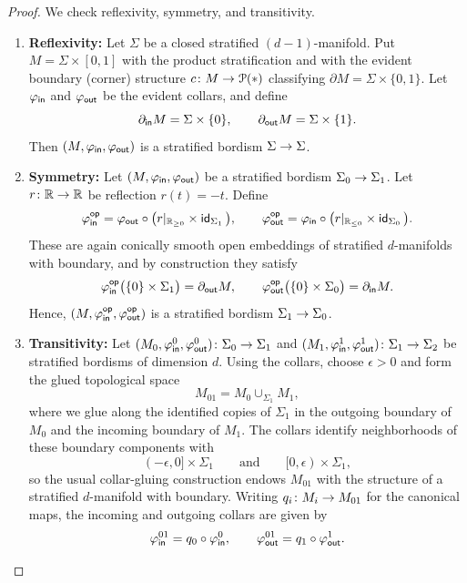 \begin{proof}
    We check reflexivity, symmetry, and transitivity.
    \begin{enumerate}
        \item \textbf{Reflexivity:} Let $\Sigma$ be a closed stratified $(d-1)$-manifold. Put $M = \Sigma\times[0,1]$ with the product stratification and with the evident boundary (corner) structure $c\colon M\rightarrow \mathcal P(*)$ classifying $\partial M = \Sigma\times\{0,1\}$. Let $\varphi_{\sf in}$ and $\varphi_{\sf out}$ be the evident collars, and define
        \begin{equation}
            \partial_{\sf in}M = \Sigma\times\{0\}, \qquad \partial_{\sf out}M = \Sigma\times\{1\}.
        \end{equation}
        Then $(M,\varphi_{\sf in},\varphi_{\sf out})$ is a stratified bordism $\Sigma\rightarrow \Sigma$.

        \item \textbf{Symmetry:} Let $(M,\varphi_{\sf in},\varphi_{\sf out})$ be a stratified bordism $\Sigma_0\rightarrow \Sigma_1$. Let $r\colon \mathbb R\rightarrow \mathbb R$ be reflection $r(t)=-t$. Define
        \[
            \varphi^{\mathsf{op}}_{\sf in}= \varphi_{\sf out}\circ\big(r|_{\mathbb R_{\ge 0}}\times \operatorname{\sf id}_{\Sigma_1}\big),\qquad
            \varphi^{\mathsf{op}}_{\sf out}= \varphi_{\sf in}\circ\big(r|_{\mathbb R_{\le 0}}\times \operatorname{\sf id}_{\Sigma_0}\big).
        \]
        These are again conically smooth open embeddings of stratified $d$-manifolds with boundary, and by construction they satisfy
        \[
            \varphi^{\mathsf{op}}_{\sf in}\big(\{0\}\times\Sigma_1\big)= \partial_{\sf out}M,
            \qquad
            \varphi^{\mathsf{op}}_{\sf out}\big(\{0\}\times\Sigma_0\big)= \partial_{\sf in}M.
        \]
        Hence, $(M,\varphi^{\mathsf{op}}_{\sf in},\varphi^{\mathsf{op}}_{\sf out})$ is a stratified bordism $\Sigma_1\rightarrow \Sigma_0$.

        \item \textbf{Transitivity:} Let $(M_0,\varphi^0_{\sf in},\varphi^0_{\sf out})\colon \Sigma_0\rightarrow \Sigma_1$ and $(M_1,\varphi^1_{\sf in},\varphi^1_{\sf out})\colon \Sigma_1\rightarrow \Sigma_2$ be stratified bordisms of dimension $d$. Using the collars, choose $\epsilon>0$ and form the glued topological space
        \[
            M_{01}= M_0\cup_{\Sigma_1} M_1,
        \]
        where we glue along the identified copies of $\Sigma_1$ in the outgoing boundary of $M_0$ and the incoming boundary of $M_1$. The collars identify neighborhoods of these boundary components with
        \[
            (-\epsilon,0]\times \Sigma_1 \qquad \text{and} \qquad [0,\epsilon)\times \Sigma_1,
        \]
        so the usual collar-gluing construction endows $M_{01}$ with the structure of a stratified $d$-manifold with boundary. Writing $q_i\colon M_i\rightarrow M_{01}$ for the canonical maps, the incoming and outgoing collars are given by
        \[
            \varphi^{01}_{\sf in}= q_0\circ \varphi^0_{\sf in},
            \qquad
            \varphi^{01}_{\sf out}= q_1\circ \varphi^1_{\sf out}.
        \]


\end{enumerate}
\end{proof}
